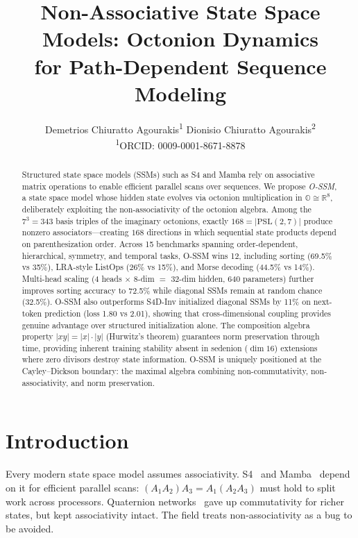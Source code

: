 \documentclass{article}
\title{Non-Associative State Space Models: Octonion Dynamics\\for Path-Dependent Sequence Modeling}
\author{%
  Demetrios Chiuratto Agourakis\textsuperscript{1}\quad
  Dionisio Chiuratto Agourakis\textsuperscript{2}\\[4pt]
  \textsuperscript{1}ORCID: 0009-0001-8671-8878
}
\newcommand{\Oct}{\mathbb{O}}
\newcommand{\R}{\mathbb{R}}
\begin{document}
\maketitle

\begin{abstract}
Structured state space models (SSMs) such as S4 and Mamba rely on associative matrix operations to enable efficient parallel scans over sequences.
We propose \emph{O-SSM}, a state space model whose hidden state evolves via octonion multiplication in $\Oct \cong \R^8$, deliberately exploiting the non-associativity of the octonion algebra.
Among the $7^3 = 343$ basis triples of the imaginary octonions, exactly $168 = |\mathrm{PSL}(2,7)|$ produce nonzero associators---creating $168$ directions in which sequential state products depend on parenthesization order.
Across 15 benchmarks spanning order-dependent, hierarchical, symmetry, and temporal tasks, O-SSM wins 12, including sorting (69.5\% vs 35\%), LRA-style ListOps (26\% vs 15\%), and Morse decoding (44.5\% vs 14\%).
Multi-head scaling (4 heads $\times$ 8-dim $=$ 32-dim hidden, 640 parameters) further improves sorting accuracy to 72.5\% while diagonal SSMs remain at random chance (32.5\%).
O-SSM also outperforms S4D-Inv initialized diagonal SSMs by 11\% on next-token prediction (loss 1.80 vs 2.01), showing that cross-dimensional coupling provides genuine advantage over structured initialization alone.
The composition algebra property $|xy| = |x|\cdot|y|$ (Hurwitz's theorem) guarantees norm preservation through time, providing inherent training stability absent in sedenion ($\dim 16$) extensions where zero divisors destroy state information.
O-SSM is uniquely positioned at the Cayley--Dickson boundary: the maximal algebra combining non-commutativity, non-associativity, and norm preservation.
\end{abstract}

\section{Introduction}
\label{sec:intro}

Every modern state space model assumes associativity.
S4~\cite{gu2022efficiently} and Mamba~\cite{gu2024mamba} depend on it for efficient parallel scans: $(A_1 A_2) A_3 = A_1 (A_2 A_3)$ must hold to split work across processors.
Quaternion networks~\cite{parcollet2019quaternion} gave up commutativity for richer states, but kept associativity intact.
The field treats non-associativity as a bug to be avoided.
\end{document}
